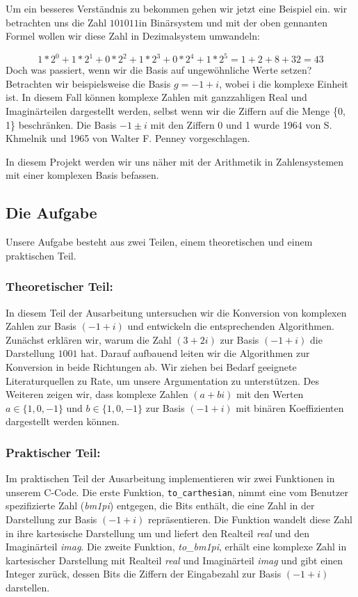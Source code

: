 \documentclass[course=erap]{aspdoc}
\begin{document}
Um ein besseres Verständnis zu bekommen gehen wir jetzt eine Beispiel ein. wir betrachten uns die Zahl $101011$\space in Binärsystem und mit der oben gennanten Formel wollen wir diese Zahl in Dezimalsystem umwandeln: 

\[1* 2^0 + 1*2^1 + 0* 2^2 + 1* 2^3 + 0* 2^4 + 1* 2^5 = 1+2+8+32 = 43 \]
Doch was passiert, wenn wir die Basis auf ungewöhnliche Werte setzen? Betrachten wir beispielsweise die Basis $g = -1 + i$, wobei i die komplexe Einheit ist. In diesem Fall können komplexe Zahlen mit ganzzahligen Real und Imaginärteilen dargestellt werden, selbst wenn wir die Ziffern auf die Menge \{0, 1\} beschränken. Die Basis $ -1 \pm i $ mit den Ziffern 0 und 1 wurde 1964 von S. Khmelnik und 1965 von Walter F. Penney vorgeschlagen.

In diesem Projekt werden wir uns näher mit der Arithmetik in Zahlensystemen mit einer komplexen Basis befassen.

\subsection{Die Aufgabe}

Unsere Aufgabe besteht aus zwei Teilen, einem theoretischen und einem praktischen Teil.

\subsubsection{Theoretischer Teil:}
In diesem Teil der Ausarbeitung untersuchen wir die Konversion von komplexen Zahlen zur Basis $(-1 + i)$ und entwickeln die entsprechenden Algorithmen. Zunächst erklären wir, warum die Zahl $(3 + 2i)$ zur Basis $(-1 + i)$ die Darstellung $1001$ hat. Darauf aufbauend leiten wir die Algorithmen zur Konversion in beide Richtungen ab. Wir ziehen bei Bedarf geeignete Literaturquellen zu Rate, um unsere Argumentation zu unterstützen. Des Weiteren zeigen wir, dass komplexe Zahlen $(a + bi)$ mit den Werten $a \in \{1, 0, -1\}$ und $b \in \{1, 0, -1\}$ zur Basis $(-1 + i)$ mit binären Koeffizienten dargestellt werden können.

\subsubsection{Praktischer Teil:}
Im praktischen Teil der Ausarbeitung implementieren wir zwei Funktionen in unserem C-Code. Die erste Funktion, \texttt{to\_carthesian}, nimmt eine vom Benutzer spezifizierte Zahl (\textit{bm1pi}) entgegen, die Bits enthält, die eine Zahl in der Darstellung zur Basis $(-1 + i)$ repräsentieren. Die Funktion wandelt diese Zahl in ihre kartesische Darstellung um und liefert den Realteil \textit{real} und den Imaginärteil \textit{imag}. Die zweite Funktion, \textit{to\_bm1pi}, erhält eine komplexe Zahl in kartesischer Darstellung mit Realteil \textit{real} und Imaginärteil \textit{imag} und gibt einen Integer zurück, dessen Bits die Ziffern der Eingabezahl zur Basis $(-1 + i)$ darstellen.
\end{document}
